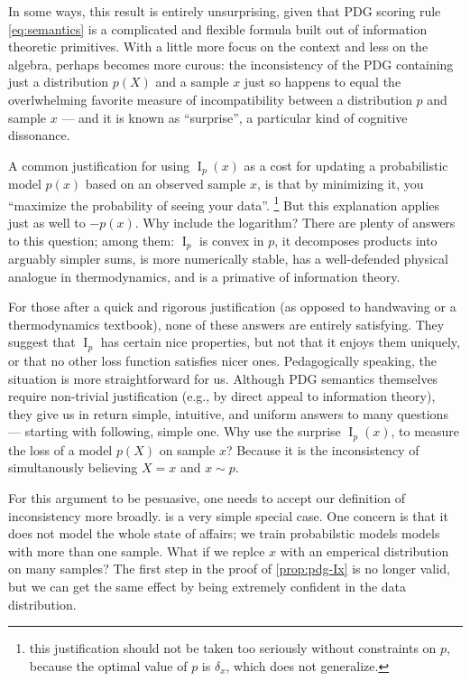 \documentclass{article}
\theoremstyle{plain}
\theoremstyle{definition}
\DeclareMathOperator{\I}{\mathrm{I}} %
\begin{document}
In some ways, this result is entirely unsurprising, given that PDG scoring rule \eqref{eq:semantics} is a complicated and flexible formula built out of information theoretic primitives. 
%
With a little more focus on the context and less on the algebra, perhaps  becomes more curous: the inconsistency of the PDG containing just a distribution $p(X)$ and a sample $x$ just so happens to equal the overlwhelming favorite measure of incompatibility between a distribution $p$ and sample $x$ --- and it is known as ``surprise'', a particular kind of cognitive dissonance.


A common justification for using $\I_p(x)$ as a cost for updating a probabilistic model $p(x)$ based on an observed sample $x$, is that by minimizing it, you  ``maximize the probability of seeing your data''.%
%
 	\footnote{this justification should not be taken too seriously  without constraints on $p$, because the optimal value of $p$  is $\delta_x$, which does not generalize.}
But this explanation applies just as well to $-p(x)$. Why include the logarithm?
There are plenty of answers to this question; among them: $\I_p$ is convex in $p$, it decomposes products into arguably simpler sums, is more numerically stable, has a well-defended physical analogue in thermodynamics, and is a primative of information theory.

For those after a quick and rigorous justification (as opposed to handwaving or a thermodynamics textbook), none of these answers are entirely satisfying.
They suggest that $\I_p$ has certain nice properties, but not that it enjoys them uniquely, or that no other loss function satisfies nicer ones.
Pedagogically speaking, the situation is more straightforward for us.
Although PDG semantics themselves require non-trivial justification (e.g., by direct appeal to information theory), they give us in return simple, intuitive, and uniform answers to many questions --- starting with following, simple one.  
Why use the surprise $\I_p(x)$, to measure the loss of a model $p(X)$ on sample $x$? Because it is the inconsistency of simultanously believing $X = x$ and $x \sim p$.  

For this argument to be pesuasive, one needs to accept our definition of inconsistency more broadly.  is a very simple special case. 
One concern is that it does not model the whole state of affairs; we train probabilstic models models with more than one sample. 
What if we replce $x$ with an emperical distribution on many samples?
The first step in the proof of \cref{prop:pdg-Ix} is no longer valid, but we can get the same effect by being extremely confident in the data distribution.
\end{document}
